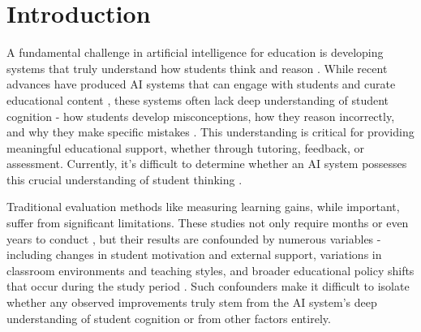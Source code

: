 \section{Introduction}

A fundamental challenge in artificial intelligence for education is developing systems that truly understand how students think and reason \cite{chowdhury2024autotutormeetslargelanguage,corbett1994knowledge,klymkowsky2024endmultiplechoicetests,sleeman}. While recent advances have produced AI systems that can engage with students and curate educational content \cite{sonkar-etal-2023-class,code_class,Markel2023GPTeachIT,schmucker2023ruffle,shridhar2022automaticgenerationsocraticsubquestions,team2024learnlm}, these systems often lack deep understanding of student cognition - how students develop misconceptions, how they reason incorrectly, and why they make specific mistakes \cite{nlet,pedalign,klymkowsky2024endmultiplechoicetests,Shibani_2024}. This understanding is critical for providing meaningful educational support, whether through tutoring, feedback, or assessment. Currently, it's difficult to determine whether an AI system possesses this crucial understanding of student thinking \cite{eedi-mining-misconceptions-in-mathematics,zaphir2024criticallyaithinkframework,malalgoqa}.



Traditional evaluation methods like measuring learning gains, while important, suffer from significant limitations. These studies not only require months or even years to conduct \cite{feng2024sampleefficienthumanevaluationlarge,pane2014effectiveness,roschelle2016online}, but their results are confounded by numerous variables - including changes in student motivation and external support, variations in classroom environments and teaching styles, and broader educational policy shifts that occur during the study period \cite{biderman2024lessonstrenchesreproducibleevaluation,laskar2024systematicsurveycriticalreview}. Such confounders make it difficult to isolate whether any observed improvements truly stem from the AI system's deep understanding of student cognition or from other factors entirely.

